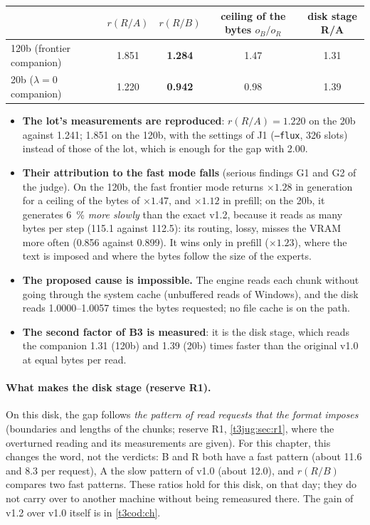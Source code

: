 \begin{center}\footnotesize
\begin{tabular}{@{}lcccc@{}}
\toprule
& $r(R/A)$ & $r(R/B)$ & ceiling of the bytes $o_B/o_R$ & disk stage R/A \\
\midrule
120b (frontier companion) & \num{1.851} & \textbf{\num{1.284}} & \num{1.47} & \num{1.31} \\
20b ($\lambda = 0$ companion) & \num{1.220} & \textbf{\num{0.942}} & \num{0.98} & \num{1.39} \\
\bottomrule
\end{tabular}
\end{center}

\begin{itemize}
\item \textbf{The lot's measurements are reproduced}: $r(R/A) = \num{1.220}$ on the 20b against \num{1.241}; \num{1.851} on the 120b, with the settings of J1 (\texttt{--flux}, 326 slots) instead of those of the lot, which is enough for the gap with \num{2.00}.
\item \textbf{Their attribution to the fast mode falls} (serious findings G1 and G2 of the judge). On the 120b, the fast frontier mode returns $\times 1.28$ in generation for a ceiling of the bytes of $\times 1.47$, and $\times 1.12$ in prefill; on the 20b, it generates \SI{6}{\percent} \emph{more slowly} than the exact v1.2, because it reads as many bytes per step (\SI{115.1}{\Mo} against \num{112.5}): its routing, lossy, misses the VRAM more often (\num{0.856} against \num{0.899}). It wins only in prefill ($\times 1.23$), where the text is imposed and where the bytes follow the size of the experts.
\item \textbf{The proposed cause is impossible.} The engine reads each chunk without going through the system cache (unbuffered reads of Windows), and the disk reads \numrange{1.0000}{1.0057} times the bytes requested; no file cache is on the path.
\item \textbf{The second factor of B3 is measured}: it is the disk stage, which reads the companion \num{1.31} (120b) and \num{1.39} (20b) times faster than the original v1.0 at equal bytes per read.
\end{itemize}

\paragraph{What makes the disk stage (reserve R1).} On this disk, the gap follows \emph{the pattern of read requests that the format imposes} (boundaries and lengths of the chunks; reserve R1, \cref{t3jug:sec:r1}, where the overturned reading and its measurements are given). For this chapter, this changes the word, not the verdicts: B and R both have a fast pattern (about 11.6 and \SI{8.3}{\Mo} per request), A the slow pattern of v1.0 (about \SI{12.0}{\Mo}), and $r(R/B)$ compares two fast patterns. These ratios hold for this disk, on that day; they do not carry over to another machine without being remeasured there. The gain of v1.2 over v1.0 itself is in \cref{t3cod:ch}.

